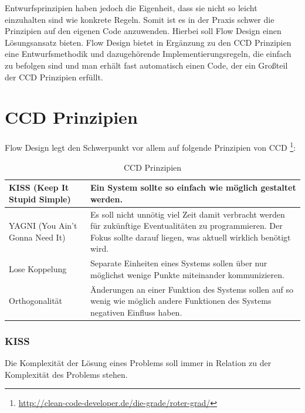 Entwurfsprinzipien haben jedoch die Eigenheit, dass sie nicht so leicht einzuhalten sind wie konkrete Regeln.
Somit ist es in der Praxis schwer die Prinzipien auf den eigenen Code anzuwenden.
Hierbei soll Flow Design einen Lösungsansatz bieten. Flow Design bietet in
Ergänzung zu den CCD Prinzipien eine Entwurfsmethodik und dazugehörende Implementierungsregeln, die
einfach zu befolgen sind und man erhält fast automatisch einen Code, der ein Großteil der CCD Prinzipien erfüllt.

\section{CCD Prinzipien}

Flow Design legt den Schwerpunkt vor allem auf folgende Prinzipien von CCD \footnote{\url{http://clean-code-developer.de/die-grade/roter-grad/}}:

\bigskip



\begin{table}[H]
	\centering
	\begin{tabular}{ | p{5cm} | p{9.5cm} | } 
	\hline
	KISS \linebreak (Keep It Stupid Simple)  & Ein System sollte so einfach wie möglich gestaltet werden. \\
	\hline
	YAGNI  \linebreak (You Ain't Gonna Need It) & Es soll nicht unnötig viel Zeit damit verbracht werden für zukünftige Eventualitäten zu programmieren. 
	Der Fokus sollte darauf liegen, was aktuell wirklich benötigt wird. \\
	\hline
	Lose Koppelung & Separate Einheiten eines Systems sollen über nur möglichst  wenige Punkte miteinander kommunizieren. \\
	\hline
	Orthogonalität & Änderungen an einer Funktion des Systems sollen auf so wenig wie möglich andere Funktionen des Systems negativen Einfluss haben. \\
	\hline
	\end{tabular}
	\medskip
	\caption{CCD Prinzipien}
\end{table}

\subsubsection{KISS}

Die Komplexität der Lösung eines Problems soll immer in Relation zu der
Komplexität des Problems stehen.

